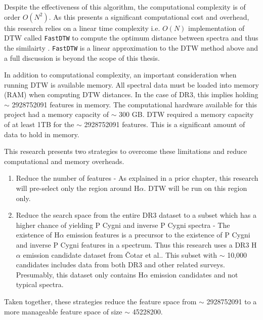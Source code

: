 Despite the effectiveness of this algorithm, the computational complexity is of order $O(N^2)$. As this presents a significant computational cost and overhead, this research relies on a linear time complexity i.e. $O(N)$ implementation of DTW called \texttt{FastDTW} to compute the optimum distance between spectra and thus the similairty \cite{salvador2007toward}. \texttt{FastDTW} is a linear approximation to the DTW method above and a full discussion is beyond the scope of this thesis. 

In addition to computational complexity, an important consideration when running DTW is available memory. All spectral data must be loaded into memory (RAM) when computing DTW distances. In the case of DR3, this implies holding $\sim$ \num[round-precision=2,round-mode=figures, scientific-notation=true]{2928752091} features in memory. The computational hardware available for this project had a memory capacity of $\sim$ 300 GB. DTW required a memory capacity of at least 1TB for the $\sim$ \num[round-precision=2,round-mode=figures, scientific-notation=true]{2928752091} features. This is a significant amount of data to hold in memory. 

This research presents two strategies to overcome these limitations and reduce computational and memory overheads.

\begin{enumerate}
    \item Reduce the number of features - As explained in a prior chapter, this research will pre-select only the region around H$\alpha$. DTW will be run on this region only.
    \item Reduce the search space from the entire DR3 dataset to a subset which has a higher chance of yielding P Cygni and inverse P Cygni spectra - The existence of H$\alpha$ emission features is a precursor to the existence of P Cygni and inverse P Cygni features in a spectrum. Thus this research uses a DR3 H$\alpha$ emission candidate dataset from Čotar et al.\cite{vcotar2021galah}. This subset with $\sim$ 10,000 candidates includes data from both DR3 and other related surveys. Presumably, this dataset only contains H$\alpha$ emission candidates and not typical spectra.
\end{enumerate}

Taken together, these strategies reduce the feature space from $\sim$ \num[round-precision=2,round-mode=figures, scientific-notation=true]{2928752091} to a more manageable feature space of size $\sim$ \num[round-precision=2,round-mode=figures, scientific-notation=true]{45228200}.

